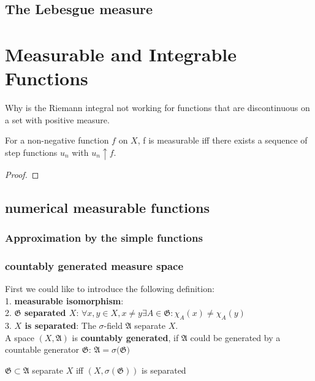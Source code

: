 \subsection{The Lebesgue measure}
\begin{theorem}
\end{theorem}



\section{Measurable and Integrable Functions}
Why is the Riemann integral not working for functions that are discontinuous on a set with positive measure.

\begin{theorem}
	For a non-negative function $f$ on $X$, f is measurable iff there exists a sequence of step functions $u_n$ with $u_n \uparrow f$. 
\end{theorem}
\begin{proof}
\end{proof}


\subsection*{numerical measurable functions}
\subsubsection*{Approximation by the simple functions}


\subsubsection*{countably generated measure space} 
First we could like to introduce the following definition:\\
1. \textbf{measurable isomorphism}:  \\
2. \textbf{$\mathfrak{G}$ separated $X$}: $\forall x, y \in X, x\neq y \exists A \in \mathfrak{G}: \chi_A(x) \neq \chi_A(y)$    \\
3. \textbf{$X$ is separated}: The $\sigma$-field $\mathfrak{A}$ separate $X$.\\
A space $(X, \mathfrak{A})$ is \textbf{countably generated}, if $\mathfrak{A}$ could be generated by a countable generator $\mathfrak{G}$: $\mathfrak{A} = \sigma{(\mathfrak{G}})$

\begin{lemma}
	$\mathfrak{G} \subset \mathfrak{A}$ separate $X$ iff $(X, \sigma(\mathfrak{G}))$ is separated
\end{lemma}

